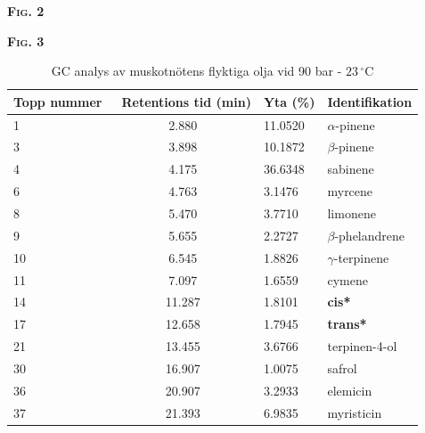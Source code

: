 \documentclass[a4paper,margin=3.25cm]{article}
\begin{document}
\begin{minipage}[t]{2cm}
\flushleft
\textsc{\textbf{Fig. 2}}
\end{minipage}
\hfill
\begin{minipage}[t]{2cm}
\flushright
\textsc{\textbf{Fig. 3}}
\end{minipage}


\begin{table}[!htbp]
\small
\centering
\caption{GC analys av muskotnötens flyktiga olja vid 90 bar - $23\,^{\circ}\mathrm{C}$}
\begin{tabular*}{\textwidth}{l @{\extracolsep{\fill}} @{}cll@{}}
\toprule
Topp nummer & \ Retentions tid (min) & Yta (\%) & Identifikation                                      \\ \midrule
1           & 2.880                & 11.0520   & $\alpha$-pinene                                      \\
3           & 3.898                & 10.1872   & $\beta$-pinene                                       \\
4           & 4.175                & 36.6348   & sabinene                                            \\
6           & 4.763                & 3.1476    & myrcene                                             \\
8           & 5.470                & 3.7710    & limonene                                            \\
9           & 5.655                & 2.2727    & $\beta$-phelandrene                                  \\
10          & 6.545                & 1.8826    & $\gamma$-terpinene                                   \\
11          & 7.097                & 1.6559    & cymene                                              \\
14          & 11.287               & 1.8101    & \textbf{cis*}   \\
17          & 12.658               & 1.7945    & \textbf{trans*} \\
21          & 13.455               & 3.6766    & terpinen-4-ol                                       \\
30          & 16.907               & 1.0075    & safrol                                              \\
36          & 20.907               & 3.2933    & elemicin                                            \\
37          & 21.393               & 6.9835    & myristicin                                          \\ \bottomrule
\end{tabular*}

\end{table}
\end{document}
